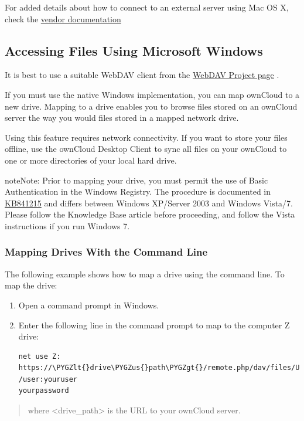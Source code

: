 \documentclass[letterpaper,10pt,english]{sphinxmanual}
\def\PYGZus{\char`\_}
\def\PYGZlt{\char`\<}
\def\PYGZgt{\char`\>}
\begin{document}
For added details about how to connect to an external server using Mac OS X,
check the \href{http://docs.info.apple.com/article.html?path=Mac/10.6/en/8160.html}{vendor documentation}


\subsection{Accessing Files Using Microsoft Windows}
\label{files/access_webdav:accessing-files-using-microsoft-windows}
It is best to use a suitable WebDAV client from the
\href{http://www.webdav.org/projects/}{WebDAV Project page} .

If you must use the native Windows implementation, you can map ownCloud to a new
drive. Mapping to a drive enables you to browse files stored on an ownCloud
server the way you would files stored in a mapped network drive.

Using this feature requires network connectivity. If you want to store your
files offline, use the ownCloud Desktop Client to sync all files on your
ownCloud to one or more directories of your local hard drive.

\begin{notice}{note}{Note:}
Prior to mapping your drive, you must permit the use of Basic
Authentication in the Windows Registry. The procedure is documented in
\href{http://support.microsoft.com/kb/841215}{KB841215} and differs between Windows XP/Server 2003 and Windows Vista/7.
Please follow the Knowledge Base article before proceeding, and follow the
Vista instructions if you run Windows 7.
\end{notice}


\subsubsection{Mapping Drives With the Command Line}
\label{files/access_webdav:kb841215}\label{files/access_webdav:mapping-drives-with-the-command-line}
The following example shows how to map a drive using the command line.  To map
the drive:
\begin{enumerate}
\item {} 
Open a command prompt in Windows.

\item {} 
Enter the following line in the command prompt to map to the computer Z
drive:

\begin{Verbatim}[commandchars=\\\{\}]
net use Z: https://\PYGZlt{}drive\PYGZus{}path\PYGZgt{}/remote.php/dav/files/USERNAME/ /user:youruser
yourpassword
\end{Verbatim}

\end{enumerate}
\begin{quote}

where \textless{}drive\_path\textgreater{} is the URL to your ownCloud server.
\end{quote}
\end{document}
